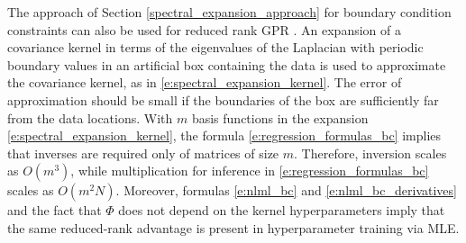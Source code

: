 \label{sec:spectral_low_rank}
The approach of Section \ref{spectral_expansion_approach} for boundary condition constraints can also be used for reduced rank GPR .
An expansion of a covariance kernel in terms of the eigenvalues of the Laplacian with periodic boundary values in an artificial box containing the data is used to approximate the covariance kernel, as in \eqref{e:spectral_expansion_kernel}. The error of approximation should be small if the boundaries of the box are sufficiently far from the data locations. 
With $m$ basis functions in the expansion \eqref{e:spectral_expansion_kernel}, the formula \eqref{e:regression_formulas_bc} implies that inverses are required only of matrices of size $m$. Therefore, inversion scales as $O(m^3)$, while multiplication for inference in \eqref{e:regression_formulas_bc} scales as $O(m^2 N)$. 
Moreover, formulas \eqref{e:nlml_bc} and \eqref{e:nlml_bc_derivatives} and the fact that $\Phi$ does not depend on the kernel hyperparameters imply that the same reduced-rank advantage is present in hyperparameter training via MLE.

